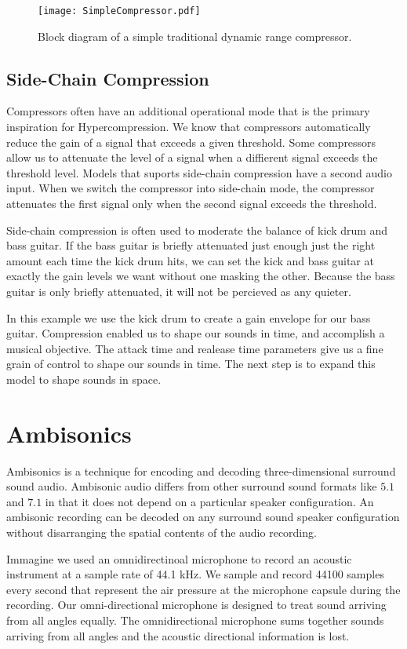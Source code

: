 \begin{figure*}
  \texttt{[image: SimpleCompressor.pdf]}
  \caption{Block diagram of a simple traditional dynamic range
    compressor.}
  \label{fig:comp-block}
\end{figure*}

\subsection{Side-Chain Compression}
\label{sec:side-chain-compr}
Compressors often have an additional operational mode that is the
primary inspiration for Hypercompression. We know that compressors
automatically reduce the gain of a signal that exceeds a given
threshold. Some compressors allow us to attenuate the level of a
signal when a diffierent signal exceeds the threshold level. Models
that suports side-chain compression have a second audio
input. When we switch the compressor into side-chain mode, the
compressor attenuates the first signal only when the second signal
exceeds the threshold. 

Side-chain compression is often used to moderate the balance of kick
drum and bass guitar. If the bass guitar is briefly attenuated just
enough just the right amount each time the kick drum hits, we can set
the kick and bass guitar at exactly the gain levels we want without
one masking the other. Because the bass guitar is only briefly
attenuated, it will not be percieved as any quieter.

In this example we use the kick drum to create a gain envelope for our
bass guitar. Compression enabled us to shape our sounds in time, and
accomplish a musical objective. The attack time and realease time
parameters give us a fine grain of control to shape our sounds in
time. The next step is to expand this model to shape sounds in space.

\section{Ambisonics}
\label{sec:ambisonics}
Ambisonics is a technique for encoding and decoding three-dimensional
surround sound audio.\cite{Gerzon1985} Ambisonic audio differs from
other surround sound formats like $5.1$ and $7.1$ in that it does not
depend on a particular speaker configuration. An ambisonic recording
can be decoded on any surround sound speaker configuration without
disarranging the spatial contents of the audio recording.

Immagine we used an omnidirectinoal microphone to record an acoustic
instrument at a sample rate of 44.1 kHz. We sample and record 44100
samples every second that represent the air pressure at the microphone
capsule during the recording. Our omni-directional microphone is
designed to treat sound arriving from all angles equally. The
omnidirectional microphone sums together sounds arriving from all
angles and the acoustic directional information is lost.


